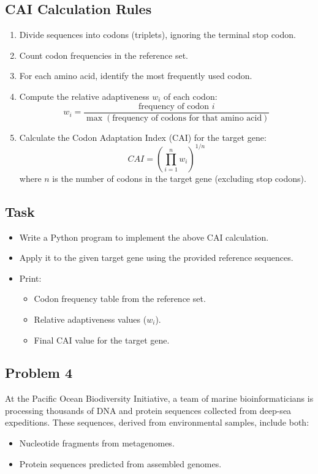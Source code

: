 \documentclass[12pt]{article}
\begin{document}
\subsection*{CAI Calculation Rules}
\begin{enumerate}[leftmargin=1.2cm]
    \item Divide sequences into codons (triplets), ignoring the terminal stop codon.
    \item Count codon frequencies in the reference set.
    \item For each amino acid, identify the most frequently used codon.
    \item Compute the relative adaptiveness $w_i$ of each codon:
    \[
        w_i = \frac{\text{frequency of codon } i}{\max(\text{frequency of codons for that amino acid})}
    \]
    \item Calculate the Codon Adaptation Index (CAI) for the target gene:
    \[
        CAI = \left( \prod_{i=1}^{n} w_i \right)^{1/n}
    \]
    where $n$ is the number of codons in the target gene (excluding stop codons).
\end{enumerate}

\subsection*{Task}
\begin{itemize}[leftmargin=1.2cm]
    \item Write a Python program to implement the above CAI calculation.
    \item Apply it to the given target gene using the provided reference sequences.
    \item Print:
    \begin{itemize}
        \item Codon frequency table from the reference set.
        \item Relative adaptiveness values ($w_i$).
        \item Final CAI value for the target gene.
    \end{itemize}
\end{itemize}

\newpage
\subsection{Problem 4}
At the Pacific Ocean Biodiversity Initiative, a team of marine bioinformaticians is processing thousands of DNA and protein sequences collected from deep-sea expeditions. These sequences, derived from environmental samples, include both:
\begin{itemize}[leftmargin=1.2cm]
    \item Nucleotide fragments from metagenomes.
    \item Protein sequences predicted from assembled genomes.
\end{itemize}
\end{document}
